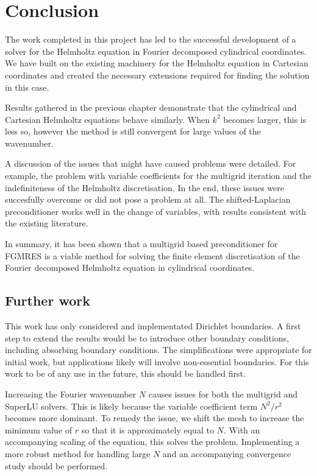 \chapter{Conclusion}

The work completed in this project has led to the successful development of a solver for the Helmholtz equation in Fourier decomposed cylindrical coordinates.
We have built on the existing machinery for the Helmholtz equation in Cartesian coordinates and created the necessary extensions required for finding the solution in this case.

Results gathered in the previous chapter demonstrate that the cylindrical and Cartesian Helmholtz equations behave similarly.
When $k^2$ becomes larger, this is less so, however the method is still convergent for large values of the wavenumber.

A discussion of the issues that might have caused problems were detailed.
For example, the problem with variable coefficients for the multigrid iteration and the indefiniteness of the Helmholtz discretisation.
In the end, these issues were succesfully overcome or did not pose a problem at all.
The shifted-Laplacian preconditioner works well in the change of variables, with results consistent with the existing literature.

In summary, it has been shown that a multigrid based preconditioner for FGMRES is a viable method for solving the finite element discretisation of the Fourier decomposed Helmholtz equation in cylindrical coordinates.






\section{Further work}

This work has only considered and implementated Dirichlet boundaries.
A first step to extend the results would be to introduce other boundary conditions, including absorbing boundary conditions.
The simplifications were appropriate for initial work, but applications likely will involve non-essential boundaries.
For this work to be of any use in the future, this should be handled first.

Increasing the Fourier wavenumber $N$ causes issues for both the multigrid and SuperLU solvers.
This is likely because the variable coefficient term $N^2/r^2$ becomes more dominant.
To remedy the issue, we shift the mesh to increase the minimum value of $r$ so that it is approximately equal to $N$.
With an accompanying scaling of the equation, this solves the problem.
Implementing a more robust method for handling large $N$ and an accompanying convergence study should be performed.

